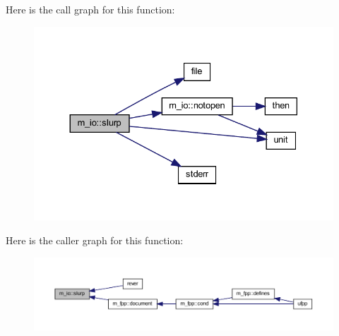 Here is the call graph for this function\+:
\nopagebreak
\begin{figure}[H]
\begin{center}
\leavevmode
\includegraphics[width=330pt]{namespacem__io_ad25822cde8058cd6861e2d9a5d729ccc_cgraph}
\end{center}
\end{figure}
Here is the caller graph for this function\+:
\nopagebreak
\begin{figure}[H]
\begin{center}
\leavevmode
\includegraphics[width=350pt]{namespacem__io_ad25822cde8058cd6861e2d9a5d729ccc_icgraph}
\end{center}
\end{figure}
\mbox{\label{namespacem__io_a7d1857c5c839bf3e096ce68fa1447d44}} 
